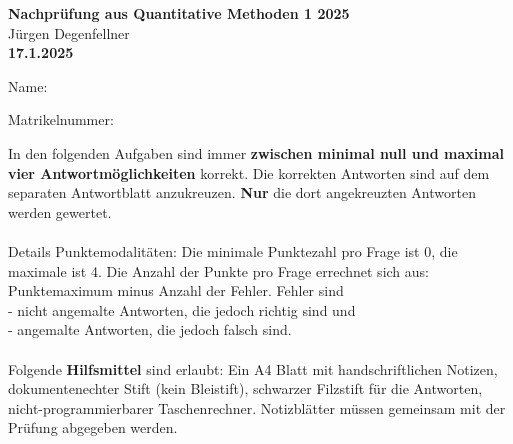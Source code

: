 \documentclass[10pt,addpoints]{exam}
\begin{document}
\begin{center}
\textbf{\Huge Nachprüfung aus Quantitative Methoden 1 2025} \\
\vspace{0.5cm}
Jürgen Degenfellner\\
\vspace{0.5cm}
\textbf{\large 17.1.2025}
\end{center}
\vspace{1cm}

\noindent Name:  \\
    
\vspace{5mm} %

\noindent Matrikelnummer: 

\vspace{10mm}

\noindent In den folgenden Aufgaben sind immer \textbf{zwischen minimal null und maximal vier Antwortmöglichkeiten} korrekt. Die korrekten Antworten sind auf dem separaten Antwortblatt anzukreuzen. \textbf{Nur} die dort angekreuzten Antworten werden gewertet. \\
\\
Details Punktemodalitäten: Die minimale Punktezahl pro Frage ist 0, die maximale ist 4. Die Anzahl der Punkte pro Frage errechnet sich aus: Punktemaximum minus Anzahl der Fehler. Fehler sind \\
 - nicht angemalte Antworten, die jedoch richtig sind und \\
 - angemalte Antworten, die jedoch falsch sind. \\
\\
Folgende \textbf{Hilfsmittel} sind erlaubt: Ein A4 Blatt mit handschriftlichen Notizen, dokumentenechter Stift (kein Bleistift), schwarzer Filzstift für die Antworten, nicht-programmierbarer Taschenrechner. Notizblätter müssen gemeinsam mit der Prüfung abgegeben werden. 
\vspace{1cm}
\end{document}
